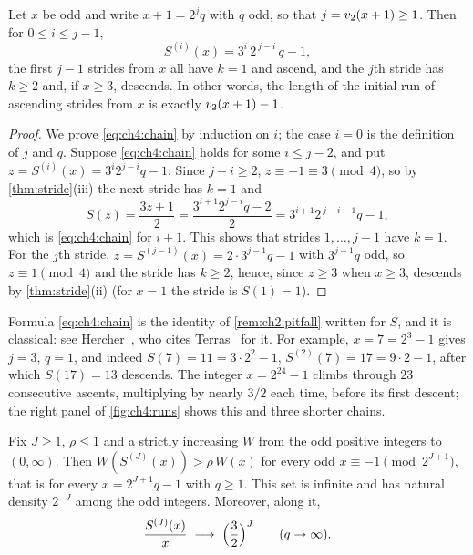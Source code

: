 \begin{proposition}\label{prop:ch4:chain}
Let $x$ be odd and write $x+1=2^{j}q$ with $q$ odd, so that $j=v_2(x+1)\ge1$.
Then for $0\le i\le j-1$,
\begin{equation}\label{eq:ch4:chain}
  S^{(i)}(x)=3^{i}\,2^{\,j-i}\,q-1 ,
\end{equation}
the first $j-1$ strides from $x$ all have $k=1$ and ascend, and the $j$th
stride has $k\ge2$ and, if $x\ge3$, descends.  In other words, the length of the initial
run of ascending strides from $x$ is exactly $v_2(x+1)-1$.
\end{proposition}

\begin{proof}
We prove \eqref{eq:ch4:chain} by induction on $i$; the case $i=0$ is the
definition of $j$ and $q$.  Suppose \eqref{eq:ch4:chain} holds for some
$i\le j-2$, and put $z=S^{(i)}(x)=3^i2^{j-i}q-1$.  Since $j-i\ge2$, $z\equiv-1
\equiv3\pmod4$, so by \cref{thm:stride}(iii) the next stride has $k=1$ and
\[
  S(z)=\frac{3z+1}{2}=\frac{3^{i+1}2^{j-i}q-2}{2}=3^{i+1}2^{\,j-i-1}q-1,
\]
which is \eqref{eq:ch4:chain} for $i+1$.  This shows that strides
$1,\dots,j-1$ have $k=1$.  For the $j$th stride, $z=S^{(j-1)}(x)=2\cdot3^{j-1}q-1$
with $3^{j-1}q$ odd, so $z\equiv1\pmod4$ and the stride has $k\ge2$, hence,
since $z\ge3$ when $x\ge3$, descends by \cref{thm:stride}(ii) (for $x=1$ the stride is $S(1)=1$).
\end{proof}

Formula \eqref{eq:ch4:chain} is the identity of \cref{rem:ch2:pitfall} written
for $S$, and it is classical: see Hercher~\cite[Lemma~8]{hercher2023},
who cites Terras~\cite{terras1976} for it.
For example, $x=7=2^3-1$ gives $j=3$, $q=1$, and indeed $S(7)=11=3\cdot2^2-1$,
$S^{(2)}(7)=17=9\cdot2-1$, after which $S(17)=13$ descends.  The integer
$x=2^{24}-1$ climbs through $23$ consecutive ascents, multiplying by nearly
$3/2$ each time, before its first descent; the right panel of
\cref{fig:ch4:runs} shows this and three shorter chains.

\begin{corollary}\label{cor:ch4:multistride}
Fix $J\ge1$, $\rho\le1$ and a strictly increasing $W$ from the odd positive
integers to $(0,\infty)$.  Then $W(S^{(J)}(x))>\rho\,W(x)$ for every odd
$x\equiv-1\pmod{2^{J+1}}$, that is for every $x=2^{J+1}q-1$ with $q\ge1$.
This set is infinite and has natural density $2^{-J}$ among the odd integers.
Moreover, along it,
\[
  \frac{S^{(J)}(x)}{x}\;\longrightarrow\;\Bigl(\frac32\Bigr)^{J}
  \qquad(q\to\infty).
\]
\end{corollary}

